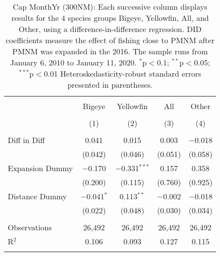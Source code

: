 
\begin{table}[!htbp] \centering 
  \caption{Cap MonthYr (300NM): Each successive column displays results for the 4 species groups Bigeye, Yellowfin, All, and Other, using a difference-in-difference regression. DID coefficients measure the effect of fishing close to PMNM after PMNM was expanded in the 2016. The sample runs from January 6, 2010 to January 11, 2020. $^{*}$p$<$0.1; $^{**}$p$<$0.05; $^{***}$p$<$0.01 Heteroskedasticity-robust standard errors presented in parentheses.} 
  \label{tbl:timeFE300NM} 
\begin{tabular}{@{\extracolsep{5pt}}lcccc} 
\\[-1.8ex]\hline 
\hline \\[-1.8ex] 
 & Bigeye & Yellowfin & All & Other \\ 
\\[-1.8ex] & (1) & (2) & (3) & (4)\\ 
\hline \\[-1.8ex] 
 Diff in Diff & 0.041 & 0.015 & 0.003 & $-$0.018 \\ 
  & (0.042) & (0.046) & (0.051) & (0.058) \\ 
  Expansion Dummy & $-$0.170 & $-$0.331$^{***}$ & 0.157 & 0.358 \\ 
  & (0.200) & (0.115) & (0.760) & (0.925) \\ 
  Distance Dummy & $-$0.041$^{*}$ & 0.113$^{**}$ & $-$0.002 & $-$0.018 \\ 
  & (0.022) & (0.048) & (0.030) & (0.034) \\ 
 \hline \\[-1.8ex] 
Observations & 26,492 & 26,492 & 26,492 & 26,492 \\ 
R$^{2}$ & 0.106 & 0.093 & 0.127 & 0.115 \\ 
\hline 
\hline \\[-1.8ex] 
\end{tabular} 
\end{table} 
